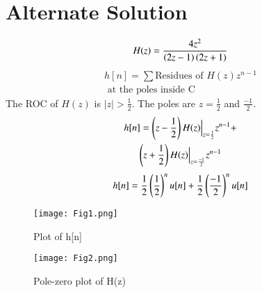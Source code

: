 \documentclass[journal,12pt,twocolumn]{IEEEtran}
\begin{document}
\section*{Alternate Solution}
\begin{align}
    H(z) = \frac{4z^2}{\left(2z - 1\right)\left(2z+1\right)}
\end{align}
\begin{multline}
    h[n] = \sum\text{Residues of }H(z)z^{n-1}\\\text{ at the poles inside C}
\end{multline}
The ROC of $H(z)$ is $|z| > \frac{1}{2}$. The poles are $z = \frac{1}{2}$ and  $\frac{-1}{2}$.
\begin{multline}
    h[n] = \left(z - \frac{1}{2}\right)H(z)\Big|_{z=\frac{1}{2}}z^{n-1} +\\ \left(z + \frac{1}{2}\right)H(z)\Big|_{z=\frac{-1}{2}}z^{n-1}
\end{multline}
\begin{align}
    h[n] = \frac{1}{2}\left(\frac{1}{2}\right)^nu[n] + \frac{1}{2}\left(\frac{-1}{2}\right)^nu[n]
\end{align}
\begin{figure}[htp]
    \centering
    \texttt{[image: Fig1.png]}
    \caption{Plot of h[n]}
    \label{fig:plot1}
\end{figure}
\begin{figure}[htp]
    \centering
    \texttt{[image: Fig2.png]}
    \caption{Pole-zero plot of H(z)}
    \label{fig:plot2}
\end{figure}
\end{document}
